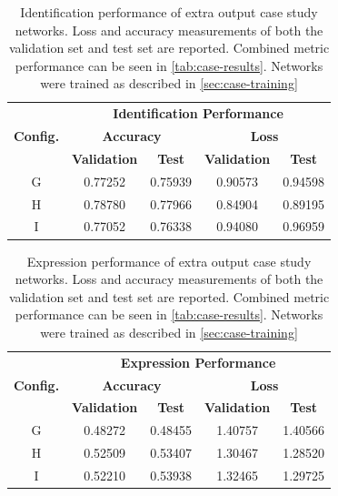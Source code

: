 \begin{table}[h!]
\begin{center}
\begin{tabular}{|c|c|c|c|c|}
\hline
\multirow{3}{*}{\textbf{Config.}} & \multicolumn{4}{|c|}{\textbf{Identification Performance}} \\ \cline{2-5}
& \multicolumn{2}{|c|}{\textbf{Accuracy}} & \multicolumn{2}{|c|}{\textbf{Loss}} \\ \cline{2-5}
& \textbf{Validation} & \textbf{Test} & \textbf{Validation} & \textbf{Test} \\ \hline
G & 0.77252 & 0.75939 & 0.90573 & 0.94598 \\ \hline
H & 0.78780 & 0.77966 & 0.84904 & 0.89195 \\ \hline
I & 0.77052 & 0.76338 & 0.94080 & 0.96959 \\ \hline
\end{tabular}
\end{center}
\caption[Identification performance of extra output case study networks]{Identification performance of extra output case study networks. Loss and accuracy measurements of both the validation set and test set are reported. Combined metric performance can be seen in \autoref{tab:case-results}. Networks were trained as described in \autoref{sec:case-training}}
\label{tab:case-results-id}
\end{table}


\begin{table}[h!]
\begin{center}
\begin{tabular}{|c|c|c|c|c|}
\hline
\multirow{3}{*}{\textbf{Config.}} & \multicolumn{4}{|c|}{\textbf{Expression Performance}} \\ \cline{2-5}
& \multicolumn{2}{|c|}{\textbf{Accuracy}} & \multicolumn{2}{|c|}{\textbf{Loss}} \\ \cline{2-5}
& \textbf{Validation} & \textbf{Test} & \textbf{Validation} & \textbf{Test} \\ \hline
G & 0.48272 & 0.48455 & 1.40757 & 1.40566 \\ \hline
H & 0.52509 & 0.53407 & 1.30467 & 1.28520 \\ \hline
I & 0.52210 & 0.53938 & 1.32465 & 1.29725 \\ \hline
\end{tabular}
\end{center}
\caption[Expression performance of extra output case study networks]{Expression performance of extra output case study networks. Loss and accuracy measurements of both the validation set and test set are reported. Combined metric performance can be seen in \autoref{tab:case-results}. Networks were trained as described in \autoref{sec:case-training}}
\label{tab:case-results-exp}
\end{table}

